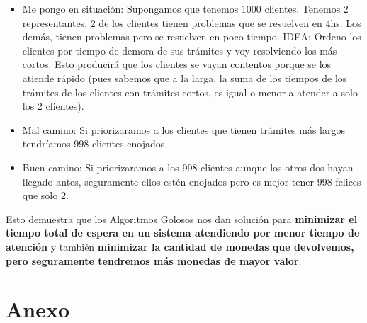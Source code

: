 \documentclass[10pt,a4paper]{article}
\begin{document}
\begin{itemize}
    \begin{itemize}
        \item Me pongo en situación: Supongamos que tenemos 1000 clientes. Tenemos 2 representantes, 2 de los clientes tienen problemas que se resuelven en 4hs. Los demás, tienen problemas pero se resuelven en poco tiempo. IDEA: Ordeno los clientes por tiempo de demora de sus trámites y voy resolviendo los más cortos. Esto producirá que los clientes se vayan contentos porque se los atiende rápido (pues sabemos que a la larga, la suma de los tiempos de los trámites de los clientes con trámites cortos, es igual o menor a atender a solo los 2 clientes).
        \item Mal camino: Si priorizaramos a los clientes que tienen trámites más largos tendríamos 998 clientes enojados. 
        \item Buen camino: Si priorizaramos a los 998 clientes aunque los otros dos hayan llegado antes, seguramente ellos estén enojados pero es mejor tener 998 felices que solo 2.
    \end{itemize}
\end{itemize}

Esto demuestra que los Algoritmos Golosos nos dan solución para \textbf{minimizar el tiempo total de espera en un sistema atendiendo por menor tiempo de atención} y también \textbf{minimizar la cantidad de monedas que devolvemos, pero seguramente tendremos más monedas de mayor valor}.


\section*{Anexo}
\end{document}
